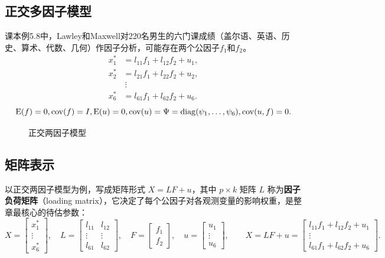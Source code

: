 \subsection{正交多因子模型}
课本例5.8中，Lawley和Maxwell对220名男生的六门课成绩（盖尔语、英语、历史、算术、代数、几何）作因子分析，可能存在两个公因子$f_1$和$f_2$。
\begin{equation}
\begin{aligned}
x_1^*&=l_{11}f_1+l_{12}f_2+u_1,\\
x_2^*&=l_{21}f_1+l_{22}f_2+u_2,\\
&\ \vdots\\
x_6^*&=l_{61}f_1+l_{62}f_2+u_6.
\end{aligned}
\end{equation}
\[
\operatorname{E}(f)=0,\operatorname{cov}(f)=I,\operatorname{E}(u)=0,
\operatorname{cov}(u)=\Psi=\operatorname{diag}(\psi_1,\ldots,\psi_6),\operatorname{cov}(u,f)=0.
\]
\begin{figure}[!htbp]\centering
{}
\caption{正交两因子模型}
\end{figure}\FloatBarrier
\subsection{矩阵表示}
以正交两因子模型为例，写成矩阵形式 $X=LF+u$，其中 $p\times k$ 矩阵 $L$ 称为\textbf{因子负荷矩阵}（loading matrix），它决定了每个公因子对各观测变量的影响权重，是整章最核心的待估参数：
\[
X=\begin{bmatrix}x_1^*\\\vdots\\x_6^*\end{bmatrix},\quad
L=\begin{bmatrix}l_{11}&l_{12}\\\vdots&\vdots\\l_{61}&l_{62}\end{bmatrix},\quad
F=\begin{bmatrix}f_1\\f_2\end{bmatrix},\quad
u=\begin{bmatrix}u_1\\\vdots\\u_6\end{bmatrix},
\qquad
X=LF+u=
\begin{bmatrix}l_{11}f_1+l_{12}f_2+u_1\\\vdots\\l_{61}f_1+l_{62}f_2+u_6\end{bmatrix}.
\]

